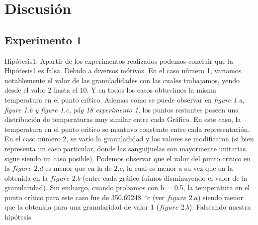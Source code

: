 \section{Discusión}


\subsection{Experimento 1}
Hipótesis1: Apartir de los experimentos realizados podemos concluir que la Hipótesis1 es falsa. Debido a diversos mótivos. En el caso número 1, variamos notablemente el valor de las granuladidades con las cuales trabajamos, yendo desde el valor 2 hasta el 10. Y en todos los casos obtuvimos la misma temperatura en el punto crítico. Ademas como se puede observar en \textit{figure 1.a, figure 1.b y figure 1.c, pág 18 \textit{experimento 1}}, los puntos restantes poseen una distribución de temperaturas muy similar entre cada Gráfico. En este caso, la temperatura en el punto critico se mantuvo constante entre cada representación.
En el caso número 2, se varío la granuladidad y los valores se modificaron (si bien representa un caso particular, donde las sanguijuelas son mayormente unitarias. sigue siendo un caso posible). Podemos observar que el valor del punto critico en la $figure$ $2.d$ es menor que en la de $2.c$, la cual es menor a su vez que en la obtenida en la $figure$ $2.b$  (entre cada gráfico fuimos disminuyendo el valor de la granularidad). Sin embargo, cuando probamos con h = 0.5, la temperatura en el punto crítico para este caso fue de 350.69248\hspace{-1.5mm}$\phantom{a}^{\circ}$c (ver $figure$ $2.a$) siendo menor que la obtenida para una granularidad de valor 1 ($figure$ $2.b$). Falseando nuestra hipótesis. \newline

